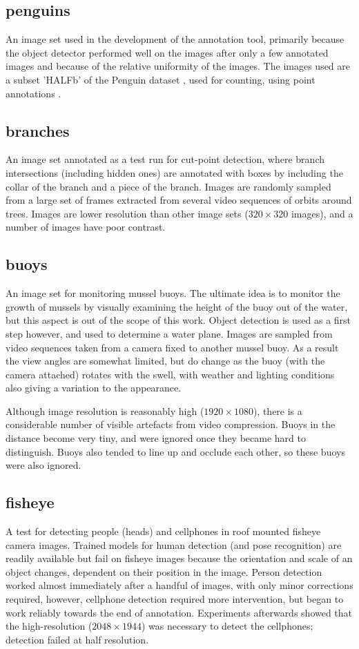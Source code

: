 \subsection{penguins}
An image set used in the development of the annotation tool, primarily because the object detector performed well on the images after only a few annotated images and because of the relative uniformity of the images. The images used are a subset 'HALFb'  of the Penguin dataset \cite{PenguinData}, used for counting, using point annotations \cite{Arteta2016}. 
\subsection{branches}
An image set annotated as a test run for cut-point detection, where branch intersections (including hidden ones) are annotated with boxes by including the collar of the branch and a piece of the branch. Images are randomly sampled from a large set of frames extracted from several video sequences of orbits around trees. Images are lower resolution than other image sets ($ 320\times320 $ images), and a number of images have poor contrast.

\subsection{buoys}
An image set for monitoring mussel buoys. The ultimate idea is to monitor the growth of mussels by visually examining the height of the buoy out of the water, but this aspect is out of the scope of this work. Object detection is used as a first step however, and used to determine a water plane. Images are sampled from video sequences taken from a camera fixed to another mussel buoy. As a result the view angles are somewhat limited, but do change as the buoy (with the camera attached) rotates with the swell, with weather and lighting conditions also giving a variation to the appearance. 

Although image resolution is reasonably high ($1920\times1080$), there is a considerable number of visible artefacts from video compression. Buoys in the distance become very tiny, and were ignored once they became hard to distinguish. Buoys also tended to line up and occlude each other, so these buoys were also ignored.
\subsection{fisheye}
    
A test for detecting people (heads) and cellphones in roof mounted fisheye camera images. Trained models for human detection (and pose recognition) are readily available but fail on fisheye images because the orientation and scale of an object changes, dependent on their position in the image. Person detection worked almost immediately after a handful of images, with only minor corrections required, however, cellphone detection required more intervention, but began to work reliably towards the end of annotation. Experiments afterwards showed that the high-resolution ($2048\times1944$) was necessary to detect the cellphones; detection failed at half resolution.

